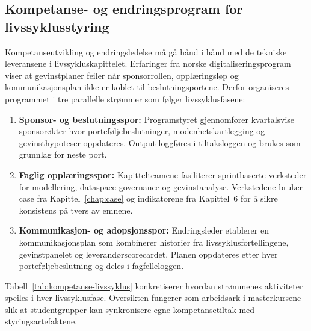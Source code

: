 \subsection*{Kompetanse- og endringsprogram for livssyklusstyring}
Kompetanseutvikling og endringsledelse må gå hånd i hånd med de tekniske leveransene i livssykluskapittelet. Erfaringer fra norske digitaliseringsprogram viser at gevinstplaner feiler når sponsorrollen, opplæringsløp og kommunikasjonsplan ikke er koblet til beslutningsportene.\citep{dfo2023endringsledelse} Derfor organiseres programmet i tre parallelle strømmer som følger livssyklusfasene:
\begin{enumerate}
    \item \textbf{Sponsor- og beslutningsspor:} Programstyret gjennomfører kvartalsvise sponsorøkter hvor porteføljebeslutninger, modenhetskartlegging og gevinsthypoteser oppdateres. Output loggføres i tiltaksloggen og brukes som grunnlag for neste port.
    \item \textbf{Faglig opplæringsspor:} Kapittelteamene fasiliterer sprintbaserte verksteder for modellering, dataspace-governance og gevinstanalyse. Verkstedene bruker case fra Kapittel~\ref{chap:case} og indikatorene fra Kapittel~6 for å sikre konsistens på tvers av emnene.\citep{ks2024kompetanseprogram}
    \item \textbf{Kommunikasjon- og adopsjonsspor:} Endringsleder etablerer en kommunikasjonsplan som kombinerer historier fra livssyklusfortellingene, gevinstpanelet og leverandørscorecardet. Planen oppdateres etter hver porteføljebeslutning og deles i fagfelleloggen.\citep{dfo2023endringsledelse,digdir2022gevinst}
\end{enumerate}

Tabell~\ref{tab:kompetanse-livssyklus} konkretiserer hvordan strømmenes aktiviteter speiles i hver livssyklusfase. Oversikten fungerer som arbeidsark i masterkursene slik at studentgrupper kan synkronisere egne kompetansetiltak med styringsartefaktene.

